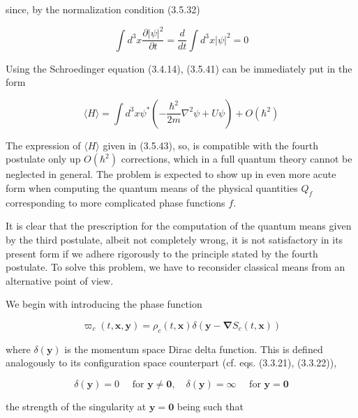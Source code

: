 \documentclass{article}
\begin{document}
since, by the normalization condition (3.5.32)
 
\begin{equation*}
\int d^{3} x \frac{\partial|\psi|^{2}}{\partial t}=\frac{d}{d t} \int d^{3} x|\psi|^{2}=0 \tag{3.5.42}
\end{equation*}
 

Using the Schroedinger equation (3.4.14), (3.5.41) can be immediately put in the form
 
\begin{equation*}
\langle H\rangle=\int d^{3} x \psi^{*}\left(-\frac{\hbar^{2}}{2 m} \nabla^{2} \psi+U \psi\right)+O\left(\hbar^{2}\right) \tag{3.5.43}
\end{equation*}
 

The expression of $\langle H\rangle$ given in (3.5.43), so, is compatible with the fourth postulate only up $O\left(\hbar^{2}\right)$ corrections, which in a full quantum theory cannot be neglected in general. The problem is expected to show up in even more acute form when computing the quantum means of the physical quantities $Q_{f}$ corresponding to more complicated phase functions $f$.

It is clear that the prescription for the computation of the quantum means given by the third postulate, albeit not completely wrong, it is not satisfactory in its present form if we adhere rigorously to the principle stated by the fourth postulate. To solve this problem, we have to reconsider classical means from an alternative point of view.

We begin with introducing the phase function
 
\begin{equation*}
\varpi_{c}(t, \boldsymbol{x}, \boldsymbol{y})=\rho_{c}(t, \boldsymbol{x}) \delta\left(\boldsymbol{y}-\boldsymbol{\nabla} S_{c}(t, \boldsymbol{x})\right) \tag{3.5.44}
\end{equation*}
 
where $\delta(\boldsymbol{y})$ is the momentum space Dirac delta function. This is defined analogously to its configuration space counterpart (cf. eqs. (3.3.21), (3.3.22)),
 
\begin{equation*}
\delta(\boldsymbol{y})=0 \quad \text { for } \boldsymbol{y} \neq \mathbf{0}, \quad \delta(\boldsymbol{y})=\infty \quad \text { for } \boldsymbol{y}=\mathbf{0} \tag{3.5.45}
\end{equation*}
 
the strength of the singularity at $\boldsymbol{y}=\mathbf{0}$ being such that
 
\end{document}
